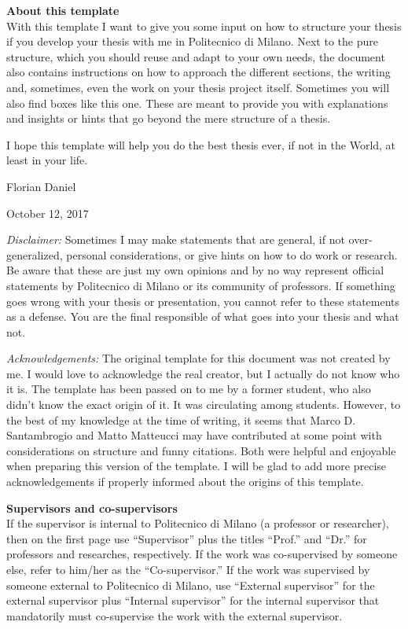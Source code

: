 \documentclass[11pt,a4paper,twoside,openright]{report}
\newcommand{\note}[2]{\begin{framed}\sffamily\small
\noindent \textbf{#1} \\ #2\end{framed}}
\begin{document}


\thispagestyle{empty} \normalfont

\clearpage
\note{About this template}{With this template I want to give you some input on how to structure your thesis if you develop your thesis with me in Politecnico di Milano. Next to the pure structure, which you should reuse and adapt to your own needs, the document also contains instructions on how to approach the different sections, the writing and, sometimes, even the work on your thesis project itself. Sometimes you will also find boxes like this one. These are meant to provide you with explanations and insights or hints that go beyond the mere structure of a thesis. 

I hope this template will help you do the best thesis ever, if not in the World, at least in your life.

\hfill Florian Daniel

\hfill October 12, 2017

\bigskip \noindent \emph{Disclaimer:} Sometimes I may make statements that are general, if not over-generalized, personal considerations, or give hints on how to do work or research. Be aware that these are just my own opinions and by no way represent official statements by Politecnico di Milano or its community of professors. If something goes wrong with your thesis or presentation, you cannot refer to these statements as a defense. You are the final responsible of what goes into your thesis and what not.

\medskip \noindent \emph{Acknowledgements:} The original template for this document was not created by me. I would love to acknowledge the real creator, but I actually do not know who it is. The template has been passed on to me by a former student, who also didn't know the exact origin of it. It was circulating among students. However, to the best of my knowledge at the time of writing, it seems that Marco D. Santambrogio and Matto Matteucci may have contributed at some point with considerations on structure and funny citations. Both were helpful and enjoyable when preparing this version of the template. I will be glad to add more precise acknowledgements if properly informed about the origins of this template.} 

\note{Supervisors and co-supervisors}{If the supervisor is internal to Politecnico di Milano (a professor or researcher), then on the first page use ``Supervisor'' plus the titles ``Prof.'' and ``Dr.'' for professors and researches, respectively. If the work was co-supervised by someone else, refer to him/her as the ``Co-supervisor.'' If the work was supervised by someone external to Politecnico di Milano, use ``External supervisor'' for the external supervisor plus ``Internal supervisor'' for the internal supervisor that mandatorily must co-supervise the work with the external supervisor. }
\clearpage
\end{document}
